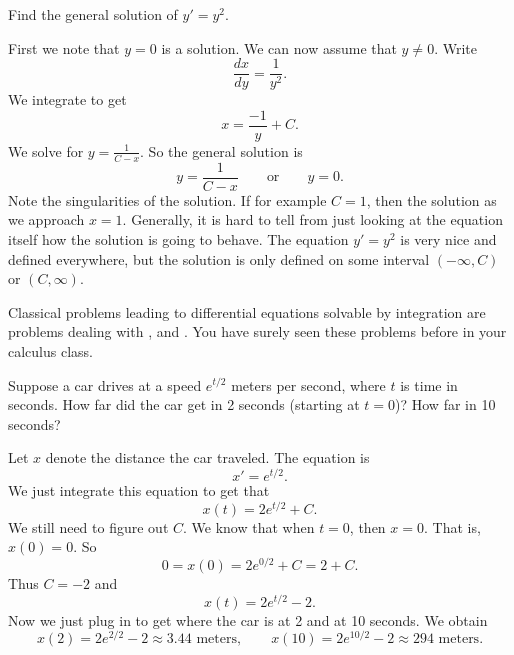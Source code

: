 \documentclass[12pt]{book}
\begin{document}
\begin{example}
Find the general solution of
$y' = y^2$.

First we note that $y=0$ is a solution.  We can now assume that $y \not= 0$.
Write
\begin{equation*}
\frac{dx}{dy} = \frac{1}{y^2} .
\end{equation*}
We integrate to get
\begin{equation*}
x = \frac{-1}{y} + C .
\end{equation*}
We solve for $y = \frac{1}{C-x}$.
So the general solution is
\begin{equation*}
y = \frac{1}{C-x} \qquad \text{or} \qquad y = 0.
\end{equation*}
Note the singularities of the solution.  If for example $C=1$, then the
solution  as we approach $x=1$.  Generally,
it is hard to tell
from just looking at the equation itself how the solution is going to behave.
The equation $y' = y^2$ is very nice and defined everywhere, but
the solution is only defined on some interval $(-\infty, C)$ or
$(C, \infty)$.
\end{example}

Classical problems leading to differential equations solvable by integration
are problems 
dealing with ,
 and .  You have surely seen these
problems before in your calculus class.

\begin{example}
Suppose a car drives at a speed $e^{t/2}$ meters per second,
where $t$ is time in seconds.
How far did the car get in 2 seconds (starting at $t=0$)?  How far in 10 seconds?

Let $x$ denote the distance the car traveled.
The equation is
\begin{equation*}
x' = e^{t/2} .
\end{equation*}
We just integrate this equation to get that
\begin{equation*}
x(t) = 2 e^{t/2} + C . 
\end{equation*}
We still need to figure out $C$.  We know that when $t=0$, then
$x=0$.  That is, $x(0) = 0$.  So
\begin{equation*}
0 = x(0) = 2e^{0/2} + C = 2 + C .
\end{equation*}
Thus $C = -2$ and 
\begin{equation*}
x(t) = 2 e^{t/2} - 2 .
\end{equation*}
Now we just plug in to get where the car is at 2 and at 10 seconds.
We obtain
\begin{equation*}
x(2) = 2e^{2/2} - 2 \approx 3.44 \text{ meters} ,
\qquad
x(10) = 2e^{10/2} - 2 \approx 294 \text{ meters} .
\end{equation*}
\end{example}
\end{document}
